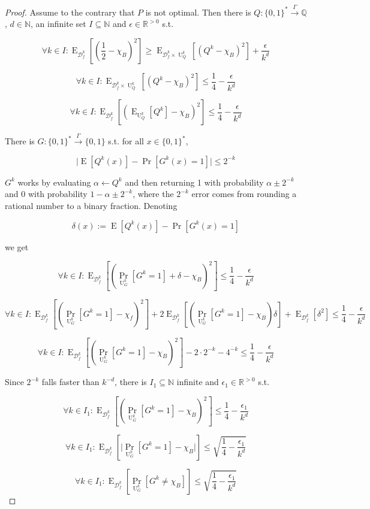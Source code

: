 \documentclass{article}
\numberwithin{equation}{section}
\theoremstyle{definition}
\theoremstyle{plain}
\newcommand{\Bool}{\{0,1\}}
\newcommand{\Words}{{\Bool^*}}
\DeclareMathOperator{\Prb}{Pr}
\DeclareMathOperator{\E}{E}
\DeclareMathOperator{\Un}{U}
\newcommand{\Nats}{\mathbb{N}}
\newcommand{\Rats}{\mathbb{Q}}
\newcommand{\Reals}{\mathbb{R}}
\newcommand{\Abs}[1]{\lvert #1 \rvert}
\newcommand{\Dist}{\mathcal{D}}
\newcommand{\Scheme}{\xrightarrow{\Gamma}}
\begin{document}
\begin{proof}

Assume to the contrary that $P$ is not optimal. Then there is ${Q: \Words \Scheme \Rats}$, $d \in \Nats$, an infinite set ${I \subseteq \Nats}$ and $\epsilon \in \Reals^{>0}$ s.t.

$$ \forall k \in I: \E_{\Dist_f^k}[(\frac{1}{2}-\chi_B)^2] \geq \E_{\Dist_f^k \times \Un_Q^k}[(Q^k-\chi_B)^2] +\frac{\epsilon}{k^d}$$

$$ \forall k \in I: \E_{\Dist_f^k \times \Un_Q^{k}}[(Q^{k}-\chi_B)^2] \leq \frac{1}{4} - \frac{\epsilon}{k^d} $$

$$ \forall k \in I: \E_{\Dist_f^k}[(\E_{\Un_Q^{k}}[Q^{k}]-\chi_B)^2] \leq \frac{1}{4} - \frac{\epsilon}{k^d} $$

There is $G: \Words \xrightarrow{\Gamma} \Bool$ s.t. for all ${x \in \Words}$, 

\[\Abs{\E[Q^{k}(x)]-\Pr[G^k(x)=1]}\leq 2^{-k}\] 

$G^k$ works by evaluating ${\alpha \leftarrow Q^{k}}$ and then returning 1 with probability ${\alpha \pm 2^{-k}}$ and 0 with probability $1-\alpha \pm 2^{-k}$, where the $2^{-k}$ error comes from rounding a rational number to a binary fraction. Denoting 

\[\delta(x):=\E[Q^{k}(x)]-\Pr[G^k(x)=1]\]

we get

$$ \forall k \in I: \E_{\Dist_f^k}[(\Prb_{\Un_G^k}[G^k=1]+\delta-\chi_B)^2] \leq \frac{1}{4} - \frac{\epsilon}{k^d} $$

$$ \forall k \in I: \E_{\Dist_f^k}[(\Prb_{\Un_G^k}[G^k=1]-\chi_f)^2]+2 \E_{\Dist_f^k}[(\Prb_{\Un_G^k}[G^k=1]-\chi_B)\delta]+\E_{\Dist_f^k}[\delta^2] \leq \frac{1}{4} - \frac{\epsilon}{k^d}$$

$$ \forall k \in I: \E_{\Dist_f^k}[(\Prb_{\Un_G^k}[G^k=1]-\chi_B)^2]-2 \cdot 2^{-k}- 4^{-k} \leq \frac{1}{4} - \frac{\epsilon}{k^d}$$

Since $2^{-k}$ falls faster than $k^{-d}$, there is $I_1 \subseteq \Nats$ infinite and $\epsilon_1 \in \Reals^{>0}$ s.t.

$$ \forall k \in I_1: \E_{\Dist_f^k}[(\Prb_{\Un_G^k}[G^k=1]-\chi_B)^2] \leq \frac{1}{4} - \frac{\epsilon_1}{k^d}$$

$$ \forall k \in I_1: \E_{\Dist_f^k}[\Abs{\Prb_{\Un_G^k}[G^k=1]-\chi_B}] \leq \sqrt{\frac{1}{4} - \frac{\epsilon_1}{k^d}} $$

$$ \forall k \in I_1: \E_{\Dist_f^k}[\Prb_{\Un_G^k}[G^k \ne \chi_B]] \leq \sqrt{\frac{1}{4} - \frac{\epsilon_1}{k^d}} $$


\end{proof}
\end{document}
